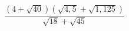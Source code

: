 \begin{ex}[type=calculate]
	\begin{condition}
		\( \dfrac{(4+\sqrt{40})(\sqrt{4,5}+\sqrt{1,125})}{\sqrt{18}+\sqrt{45}} \)
	\end{condition}
\end{ex}